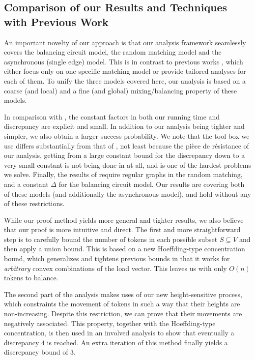 \documentclass[twoside,leqno]{article}
\DeclareMathOperator{\1}{\mathbf{1}}
\numberwithin{equation}{section}
\begin{document}
\subsection{Comparison of our Results and Techniques with Previous Work}

An important novelty of our approach is that our analysis framework seamlessly covers the balancing circuit model, the random matching model and the asynchronous (single edge) model. This is in contrast to previous works \cite{DBLP:conf/focs/RabaniSW98,DBLP:journals/mst/MuthukrishnanGS98,DBLP:conf/focs/SauerwaldS12,DBLP:conf/stoc/FriedrichS09}, which either focus only on one specific matching model or provide tailored analyses for each of them. To unify the three models covered here, our analysis is based on a coarse (and local) and a fine (and global) mixing/balancing property of these models.

In comparison with \cite{DBLP:conf/focs/SauerwaldS12}, the constant factors in both our running time and discrepancy are explicit and small. In addition to our analysis being tighter and simpler, we also obtain a larger success probability. We note that the tool box we use differs substantially from that of \cite{DBLP:conf/focs/SauerwaldS12}, not least because the pièce de résistance of our analysis, getting from a large constant bound for the discrepancy down to a very small constant is not being done in \cite{DBLP:conf/focs/SauerwaldS12} at all, and is one of the hardest problems we solve.
Finally, the results of \cite{DBLP:conf/focs/SauerwaldS12} require regular graphs in the random matching, and a constant $\Delta$ for the balancing circuit model. Our results are covering both of these models (and additionally the asynchronous model), and hold without any of these restrictions.

While our proof method yields more general and tighter results, we also believe that our proof is more intuitive and direct. The first and more straightforward step is to carefully bound the number of tokens in each possible subset $S \subseteq V$ and then apply a union bound. This is based on a new Hoeffding-type concentration bound, which generalizes and tightens previous bounds \cite{DBLP:conf/stoc/FriedrichS09, DBLP:conf/focs/SauerwaldS12} in that it works for \emph{arbitrary} convex combinations of the load vector. This leaves us with only $O(n)$ tokens to balance.

The second part of the analysis makes uses of our new height-sensitive process, which constraints the movement of tokens in such a way that their heights are non-increasing. Despite this restriction, we can prove that their movements are negatively associated. This property, together with the Hoeffding-type concentration, is then used in an involved analysis to show that eventually a discrepancy $4$ is reached. An extra iteration of this method finally yields a discrepancy bound of $3$. 
\end{document}
